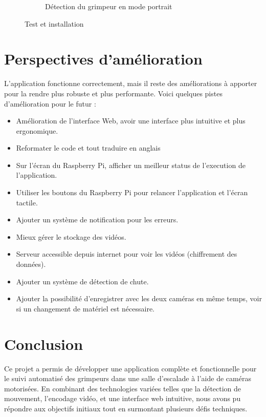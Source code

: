 \documentclass[a4paper, 11pt, french]{article}
\newcounter{obj}
\begin{document}
\begin{figure}[!ht]
\begin{center}
\begin{subfigure}[b]{0.45\textwidth}
            \caption{Détection du grimpeur en mode portrait}
            \label{fig:test4}
        \end{subfigure}
        \caption{Test et installation}
        \label{fig:testDetection}
     \end{center}
\end{figure}

\section{Perspectives d'amélioration}
L'application fonctionne correctement, mais il reste des améliorations à apporter pour la rendre plus robuste et plus performante. Voici quelques pistes d'amélioration pour le futur :
\begin{itemize}
  \item Amélioration de l'interface Web, avoir une interface plus intuitive et plus ergonomique.
  \item Reformater le code et tout traduire en anglais
  \item Sur l'écran du Raspberry Pi, afficher un meilleur status de l'execution de l'application.
  \item Utiliser les boutons du Raspberry Pi pour relancer l'application et l'écran tactile. 
  \item Ajouter un système de notification pour les erreurs.
  \item Mieux gérer le stockage des vidéos.
  \item Serveur accessible depuis internet pour voir les vidéos (chiffrement des données).
  \item Ajouter un système de détection de chute.
  \item Ajouter la possibilité d'enregistrer avec les deux caméras en même temps, voir si un changement de matériel est nécessaire.
\end{itemize}




\section{Conclusion}
Ce projet a permis de développer une application complète et fonctionnelle pour le suivi automatisé des grimpeurs dans une salle d'escalade à l'aide de caméras motorisées. En combinant des technologies variées telles que la détection de mouvement, l'encodage vidéo, et une interface web intuitive, nous avons pu répondre aux objectifs initiaux tout en surmontant plusieurs défis techniques.
\end{document}
